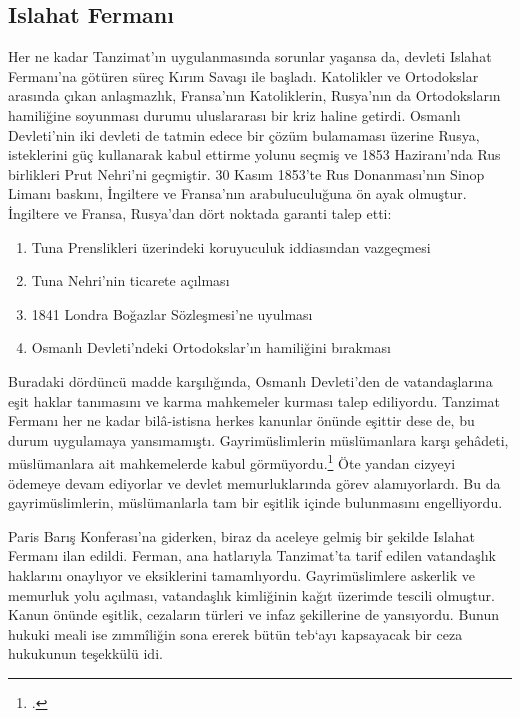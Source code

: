 \subsection{Islahat Fermanı}
\indent\indent Her ne kadar Tanzimat'ın uygulanmasında sorunlar yaşansa da, devleti Islahat Fermanı'na götüren süreç Kırım Savaşı ile başladı. Katolikler ve Ortodokslar arasında çıkan anlaşmazlık, Fransa'nın 
Katoliklerin, Rusya'nın da Ortodoksların hamiliğine soyunması durumu uluslararası bir kriz haline getirdi. Osmanlı Devleti'nin iki devleti de tatmin edece bir çözüm bulamaması üzerine Rusya, isteklerini 
güç kullanarak kabul ettirme yolunu seçmiş ve 1853 Haziranı'nda Rus birlikleri Prut Nehri'ni geçmiştir. 30 Kasım 1853'te Rus Donanması'nın Sinop Limanı baskını, İngiltere ve Fransa'nın arabuluculuğuna ön ayak 
olmuştur. İngiltere ve Fransa, Rusya'dan dört noktada garanti talep etti:
\begin{enumerate}
    \item Tuna Prenslikleri üzerindeki koruyuculuk iddiasından vazgeçmesi
    \item Tuna Nehri'nin ticarete açılması
    \item 1841 Londra Boğazlar Sözleşmesi'ne uyulması
    \item Osmanlı Devleti'ndeki Ortodokslar'ın hamiliğini bırakması
\end{enumerate} 

Buradaki dördüncü madde karşılığında, Osmanlı Devleti'den de vatandaşlarına eşit haklar tanımasını ve karma mahkemeler kurması talep ediliyordu. Tanzimat Fermanı her ne kadar bilâ-istisna herkes kanunlar önünde 
eşittir dese de, bu durum uygulamaya yansımamıştı. Gayrimüslimlerin müslümanlara karşı şehâdeti, müslümanlara ait mahkemelerde kabul görmüyordu.\footcite[284]{tanzimat} Öte yandan cizyeyi ödemeye devam ediyorlar ve 
devlet memurluklarında görev alamıyorlardı. Bu da gayrimüslimlerin, müslümanlarla tam bir eşitlik içinde bulunmasını engelliyordu.

Paris Barış Konferası'na giderken, biraz da aceleye gelmiş bir şekilde Islahat Fermanı ilan edildi. Ferman, ana hatlarıyla Tanzimat'ta tarif edilen vatandaşlık haklarını onaylıyor ve eksiklerini tamamlıyordu. Gayrimüslimlere 
askerlik ve memurluk yolu açılması, vatandaşlık kimliğinin kağıt üzerimde tescili olmuştur. Kanun önünde eşitlik, cezaların türleri ve infaz şekillerine de yansıyordu.
Bunun hukuki meali ise zımmîliğin sona ererek bütün teb`ayı kapsayacak bir ceza hukukunun teşekkülü idi.

